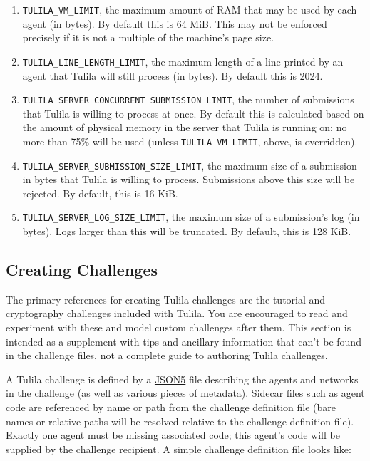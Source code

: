 \documentclass[12pt]{article}
\begin{document}
\begin{enumerate}
  \item \texttt{TULILA\_VM\_LIMIT}, the maximum amount of RAM that may be used by each agent (in bytes). By default this is 64 MiB. This may not be enforced precisely if it is not a multiple of the machine's page size.
  \item \texttt{TULILA\_LINE\_LENGTH\_LIMIT}, the maximum length of a line printed by an agent that Tulila will still process (in bytes). By default this is 2024.
  \item \texttt{TULILA\_SERVER\_CONCURRENT\_SUBMISSION\_LIMIT}, the number of submissions that Tulila is willing to process at once. By default this is calculated based on the amount of physical memory in the server that Tulila is running on; no more than 75\% will be used (unless \texttt{TULILA\_VM\_LIMIT}, above, is overridden).
  \item \texttt{TULILA\_SERVER\_SUBMISSION\_SIZE\_LIMIT}, the maximum size of a submission in bytes that Tulila is willing to process. Submissions above this size will be rejected. By default, this is 16 KiB.
  \item \texttt{TULILA\_SERVER\_LOG\_SIZE\_LIMIT}, the maximum size of a submission's log (in bytes). Logs larger than this will be truncated. By default, this is 128 KiB.
\end{enumerate}


\subsection{Creating Challenges}

The primary references for creating Tulila challenges are the tutorial and cryptography challenges included with Tulila. You are encouraged to read and experiment with these and model custom challenges after them. This section is intended as a supplement with tips and ancillary information that can't be found in the challenge files, not a complete guide to authoring Tulila challenges.

A Tulila challenge is defined by a \href{https://json5.org/}{JSON5} file describing the agents and networks in the challenge (as well as various pieces of metadata). Sidecar files such as agent code are referenced by name or path from the challenge definition file (bare names or relative paths will be resolved relative to the challenge definition file). Exactly one agent must be missing associated code; this agent's code will be supplied by the challenge recipient. A simple challenge definition file looks like:
\end{document}
